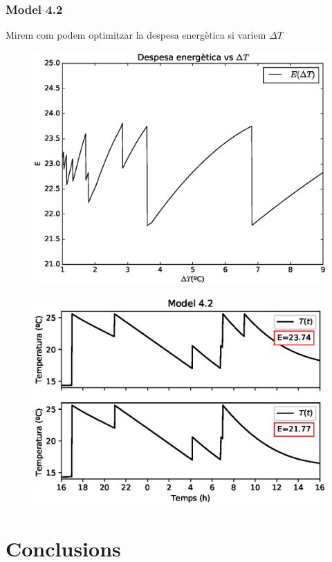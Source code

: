 \documentclass[11pt]{article}
\begin{document}
\subsubsection*{Model 4.2}
Mirem com podem optimitzar la despesa energètica si variem $\Delta T$
\begin{figure}[h!]
	\centering
	\includegraphics[width=13cm]{despesa.eps}
\end{figure}
\begin{figure}[h!]
	\centering
	\includegraphics[width=13cm]{model422.eps}
\end{figure}
\section*{Conclusions}
\end{document}
